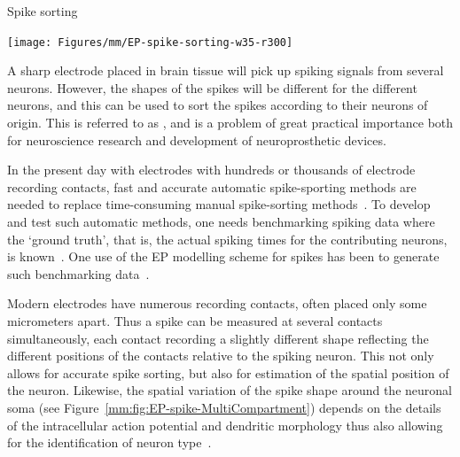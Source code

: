 \begin{boxfloat}{Spike sorting}
  \label{mm:box:spike-sorting}
%
\centerline{\texttt{[image: Figures/mm/EP-spike-sorting-w35-r300]}}\vspace*{6pt}
%
A sharp electrode placed in brain tissue will pick up spiking signals from several neurons. 
However, the shapes of the spikes will be different for the different neurons, and this can be used to sort the spikes according to their neurons of origin. This is referred to as , 
and is a problem of great practical importance both for neuroscience research and development of neuroprosthetic devices. 

In the present day with electrodes with hundreds or thousands of electrode recording contacts, fast and accurate automatic spike-sporting methods are needed to replace time-consuming manual spike-sorting methods~\citep{Quiroga2007}. To develop and test such automatic methods, one needs
benchmarking spiking data where the `ground truth', that is, the actual spiking times for the contributing neurons, is known~\citep{Einevoll2012}.
One use of the EP modelling scheme for spikes has been to generate such benchmarking data~\citep{CamunasMesa2013,Hagen2015,MondragonGonzalez2017}. 

Modern electrodes have numerous recording contacts, often placed only some micrometers apart. Thus a spike can be measured at several contacts
simultaneously, each contact recording a slightly different shape reflecting the different positions of the contacts relative to the spiking neuron. 
This not only allows for accurate spike sorting, but also for estimation of the spatial position of the neuron. Likewise, the spatial variation of the 
spike shape around the neuronal soma (see Figure~\ref{mm:fig:EP-spike-MultiCompartment}) 
depends on the details of the intracellular action potential and dendritic morphology thus also allowing for the 
identification of neuron type~\citep{Buccino2018}.    
\end{boxfloat}

